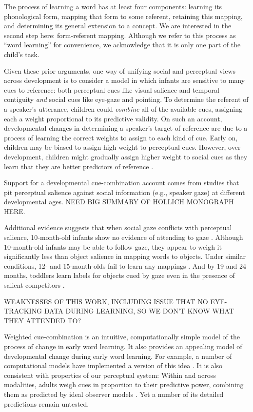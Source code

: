 \documentclass[man,floatsintext]{apa6}
\begin{document}
The process of learning a word has at least four components: learning its phonological form, mapping that form to some referent, retaining this mapping, and determining its general extension to a concept. We are interested in the second step here: form-referent mapping. Although we refer to this process as ``word learning'' for convenience, we acknowledge that it is only one part of the child's task.

Given these prior arguments, one way of unifying social and perceptual views across development is to consider a model in which infants are sensitive to many cues to reference: both perceptual cues like visual salience and temporal contiguity \emph{and} social cues like eye-gaze and pointing. To determine the referent of a speaker's utterance, children could \emph{combine} all of the available cues, assigning each a weight proportional to its predictive validity. On such an account, developmental changes in determining a speaker's target of reference are due to a process of learning the correct weights to assign to each kind of cue. Early on, children may be biased to assign high weight to perceptual cues. However, over development, children might gradually assign higher weight to social cues as they learn that they are better predictors of reference \cite{Hollich2000, Golinkoff2006}.



Support for a developmental cue-combination account comes from studies that pit perceptual salience against social information (e.g., speaker gaze) at different developmental ages. NEED BIG SUMMARY OF HOLLICH MONOGRAPH HERE. 

Additional evidence suggests that when social gaze conflicts with perceptual salience, 10-month-old infants show no evidence of attending to gaze \cite{Pruden2006}. Although 10-month-old infants may be able to follow gaze, they appear to weigh it significantly less than object salience in mapping words to objects. Under similar conditions, 12- and 15-month-olds fail to learn any mappings \cite{Hollich2000, Houston-Price2006}. And by 19 and 24 months, toddlers learn labels for objects cued by gaze even in the presence of salient competitors \cite{Moore1999, Hollich2000}. 

WEAKNESSES OF THIS WORK, INCLUDING ISSUE THAT NO EYE-TRACKING DATA DURING LEARNING, SO WE DON'T KNOW WHAT THEY ATTENDED TO? 

Weighted cue-combination is an intuitive, computationally simple model of the process of change in early word learning. It also provides an appealing model of developmental change during early word learning. For example, a number of computational models have implemented a version of this idea  \cite{Frank2007b,Frank2013a}. It is also consistent with properties of our perceptual system: Within and across modalities, adults weigh cues in proportion to their predictive power, combining them as predicted by ideal observer models \cite{Ernst2002, Jacobs2002}. Yet a number of its detailed predictions remain untested. 
\end{document}
